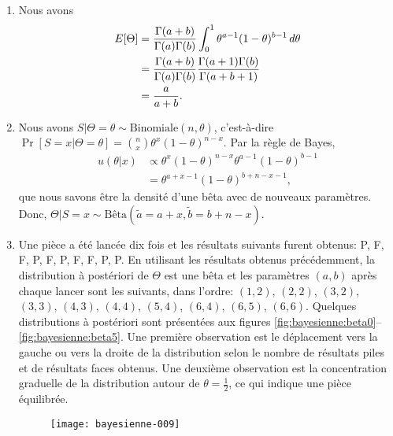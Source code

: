 \begin{exercice}
\begin{rep}
\begin{enumerate}
    \end{enumerate}
  \end{rep}
  \begin{sol}
    \begin{enumerate}
    \item Nous avons
      \begin{align*}
        E [ \Theta ]
        &= \frac{\Gamma(a + b)}{\Gamma(a) \Gamma(b)}
        \int_0^1 \theta^{a - 1} (1 - \theta)^{b - 1}\, d\theta \\
        &= \frac{\Gamma(a + b)}{\Gamma(a) \Gamma(b)}
        \frac{\Gamma(a+1) \Gamma(b)}{\Gamma(a+b+1)} \\
        &= \frac{a}{a + b}.
      \end{align*}
    \item Nous avons $S|\Theta = \theta \sim \text{Binomiale}(n, \theta)$,
      c'est-à-dire $\Pr[S = x|\Theta = \theta] = \binom{n}{x}\theta^x
      (1 - \theta)^{n-x}$. Par la règle de Bayes,
      \begin{align*}
        u(\theta|x)
        &\propto \theta^x (1 - \theta)^{n-x}
        \theta^{a - 1} (1 - \theta)^{b - 1} \\
        &= \theta^{a + x - 1}(1 - \theta)^{b + n - x - 1},
      \end{align*}
      que nous savons être la densité d'une bêta avec de nouveaux
      paramètres.  Donc, $\Theta|S = x \sim \text{Bêta}(\tilde{a}
      = a + x, \tilde{b} = b + n - x)$.
    \item Une pièce a été lancée dix fois et les résultats suivants
      furent obtenus: P, F, F, P, F, P, F, F, P, P. En utilisant les
      résultats obtenus précédemment, la distribution à postériori de
      $\Theta$ est une bêta et les paramètres $(a, b)$ après chaque
      lancer sont les suivants, dans l'ordre: $(1, 2)$, $(2, 2)$,
      $(3, 2)$, $(3, 3)$, $(4, 3)$, $(4, 4)$, $(5, 4)$, $(6, 4)$,
      $(6, 5)$, $(6, 6)$. Quelques distributions à postériori sont
      présentées aux figures
      \ref{fig:bayesienne:beta0}--\ref{fig:bayesienne:beta5}. Une
      première observation est le déplacement vers la gauche ou vers
      la droite de la distribution selon le nombre de résultats piles
      et de résultats faces obtenus. Une deuxième observation est la
      concentration graduelle de la distribution autour de
      $\theta = \frac{1}{2}$, ce qui indique une pièce équilibrée.
      \begin{figure}
        \begin{minipage}[t]{0.45\textwidth}
\texttt{[image: bayesienne-009]}

\end{minipage}
\end{figure}
\end{enumerate}
\end{sol}
\end{exercice}
